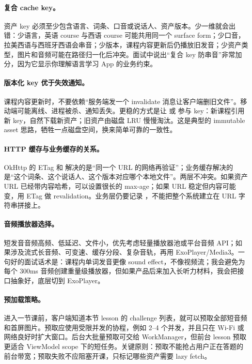 \paragraph{复合 cache key。} 资产 key 必须至少包含语言、词条、口音或说话人、资产版本。少一维就会出错：少语言，英语 course 与西语 course 可能共用同一个 surface form；少口音，拉美西语与西班牙西语会串音；少版本，课程内容更新后仍播放旧发音；少资产类型，图片和音频可能在路径归一化后冲突。\srcinferred 面试中说出“复合 key 防串音”非常加分，因为它显示你理解语言学习 App 的业务约束。

\paragraph{版本化 key 优于失效通知。} 课程内容更新时，不要依赖“服务端发一个 invalidate 消息让客户端删旧文件”。移动端可能离线、进程被杀、通知丢失。更稳的方式是让  或  参与 key：新课程引用新 key，自然下载新资产；旧资产由磁盘 LRU 慢慢淘汰。\srcinferred 这是典型的 immutable asset 思路，牺牲一点磁盘空间，换来简单可靠的一致性。

\paragraph{HTTP 缓存与业务缓存的关系。} OkHttp 的 ETag 和  解决的是“同一个 URL 的网络再验证”；业务缓存解决的是“这个词条、这个说话人、这个版本对应哪个本地文件”。两层不冲突。\srcinferred 如果资产 URL 已经带内容哈希，可以设置很长的 max-age；如果 URL 稳定但内容可能变，用 ETag 做 revalidation。业务层仍要记录 ，不能把整个系统建立在 URL 字符串拼接上。

\paragraph{音频播放器选择。} 短发音音频高频、低延迟、文件小，优先考虑轻量播放器池或平台音频 API；如果涉及流式长音频、可变速、缓存分段、复杂音轨，再用 ExoPlayer/Media3。\srcinferred 一句好的面试话术是：课程内单词发音更像 sound effect，不像视频流；我会避免为每个 300ms 音频创建重量级播放器，但如果产品后来加入长听力材料，我会把接口抽象好，底层切到 ExoPlayer。

\paragraph{预加载策略。} 进入一节课前，客户端知道本节 lesson 的 challenge 列表，就可以预取全部短音频和首屏图片。预取应使用受限并发的协程，例如 2--4 个并发，并且只在 Wi-Fi 或网络良好时扩大窗口。后台大批量预取可交给 WorkManager，但前台 lesson 预取更适合 ViewModel scope 下的短任务。\srcinferred 关键原则：预取不能抢占用户正在答题的前台带宽；预取失败不应阻塞开课，只标记哪些资产需要 lazy fetch。

